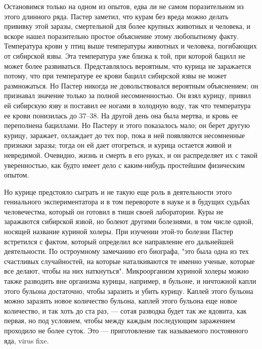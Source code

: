 Остановимся только на одном из опытов, едва ли не самом поразительном из
этого длинного ряда. Пастер  заметил, что курам  без вреда можно  делать
прививку этой заразы, смертельной для более крупных животных и человека,
и вскоре нашел поразительно простое объяснение этому любопытному  факту.
Температура  крови  у  птиц   выше  температуры  животных  и   человека,
погибающих от  сибирской язвы.  Эта температура  уже близка  к той,  при
которой бацилл не может более развиваться. Представлялось вероятным, что
курица не  заражается  потому,  что  при  температуре  ее  крови  бацилл
сибирской  язвы   не   может   размножаться.  Но   Пастер   никогда   не
довольствовался вероятным объяснением; он  признавал значение только  за
полной несомненностью.  Он  взял  курицу, привил  ей  сибирскую  язву  и
поставил ее  ногами  в  холодную  воду, так  что  температура  ее  крови
понизилась до  37--38.  На другой  день  она  была мертва,  и  кровь  ее
переполнена бациллами.  Но Пастеру  и этого  показалось мало;  он  берет
другую курицу, заражает,  охлаждает до  тех пор, пока  в ней  появляются
несомненные признаки  заразы;  тогда он  ей  дает отогреться,  и  курица
остается живой и невредимой. Очевидно, жизнь и смерть в его руках, и  он
распределяет  их  с   такой  уверенностью,  как   будто  имеет  дело   с
каким-нибудь простейшим физическим опытом.

Но курице предстояло сыграть  и не такую еще  роль в деятельности  этого
гениального экспериментатора  и в  том перевороте  в науке  и в  будущих
судьбах человечестма, который он готовил в тиши своей лаборатории.  Куры
не заражаются сибирской язвой, но болеют другими болезнями, в том  числе
одной, носящей  название куриной  холеры. При  изучении этой-то  болезни
Пастер встретился  с  фактом,  который  определил  все  направление  его
дальнейшей деятельности.  По остроумному  замечанию его  биографа,  "это
была одна из  тех счастливых случайностей,  на которые наталкиваются  те
именно  ученые,   которые  все   делают,  чтобы   на  них   наткнуться".
Микроорганизм куриной холеры можно также разводить вне организма курицы,
например, в бульоне, и ничтожной  капли этого бульона достаточно,  чтобы
заразить и  убить  курицу. Каплей  этого  бульона можно  заразить  новое
количество бульона, каплей  этого бульона  еще новое  количество, и  так
хоть до ста раз, --- сотая разводка  будет так же ядовита, как первая,  но
под условием,  чтобы между  каждым последующим  заражением проходило  не
более суток. Это --- приготовление так называемого постоянного яда,  virus
fixe.


